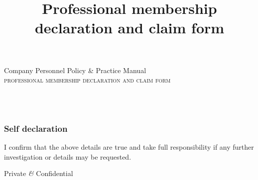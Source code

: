\documentclass[a4paper,12pt]{article} %
\title{Professional membership declaration and claim form}
\date{}
\begin{document}
\begin{center}
	\scriptsize
	Company \hfill Personnel Policy \& Practice Manual \\
	\vspace{18mm}
	\normalsize
	\Large\textsc{professional membership declaration and claim form}
\end{center}

  \vspace{12mm}

  \begin{Form}

  \vspace{3mm}

\noindent\begin{Form}
	 \\
	 \\
\end{Form}


  \end{Form}

\subsubsection*{Self declaration} %
\label{ssub:self_declaration}

  I confirm that the above details are true and take full responsibility if any further investigation or details may be requested.

  \vspace{3mm}

  \begin{Form}
  \end{Form}


  \vfill

  \begin{center}
  \scriptsize
    Private \emph{\&} Confidential
  \end{center}
\end{document}
